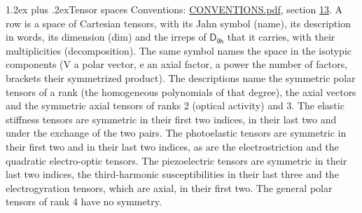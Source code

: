 \documentclass[10pt,a4paper]{article}
\makeatletter
\renewcommand\section{\@startsection{section}{1}{\z@}{-3ex plus -1ex minus -.2ex}%
  {1.2ex plus .2ex}{\normalfont\large\sffamily\bfseries\color{parttitle}}}
\numberwithin{equation}{section}
\newcommand{\grp}[1]{\mathsf{#1}}
\makeatother
\begin{document}
\section{Tensor spaces}\label{s:tensor_spaces}
Conventions: \href{../../CONVENTIONS.pdf}{CONVENTIONS.pdf}, section \href{../../CONVENTIONS.pdf\#conv.13}{13}.
\leavevmode\label{n:head.name}\label{n:head.description}\label{n:head.dim}\label{n:head.decomposition}A row is a space of Cartesian tensors, with its Jahn symbol (name), its description in words, its dimension (dim) and the irreps of $\grp{D_{9h}}$ that it carries, with their multiplicities (decomposition). \label{n:label.jahn}The same symbol names the space in the isotypic components (V a polar vector, e an axial factor, a power the number of factors, brackets their symmetrized product). The descriptions name the symmetric polar tensors of a rank (the homogeneous polynomials of that degree), the axial vectors and the symmetric axial tensors of ranks 2 (optical activity) and 3. The elastic stiffness tensors are symmetric in their first two indices, in their last two and under the exchange of the two pairs. The photoelastic tensors are symmetric in their first two and in their last two indices, as are the electrostriction and the quadratic electro-optic tensors. The piezoelectric tensors are symmetric in their last two indices, the third-harmonic susceptibilities in their last three and the electrogyration tensors, which are axial, in their first two. The general polar tensors of rank 4 have no symmetry.
\end{document}
